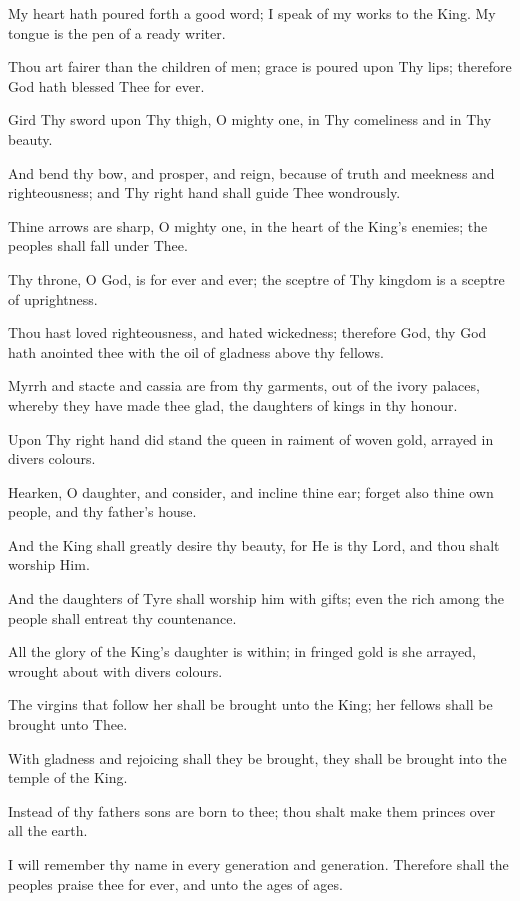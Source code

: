 My heart hath poured forth a good word; I speak of my works to the King. My tongue is the pen of a ready writer.

Thou art fairer than the children of men; grace is poured upon Thy lips; therefore God hath blessed Thee for ever.

Gird Thy sword upon Thy thigh, O mighty one, in Thy comeliness and in Thy beauty.

And bend thy bow, and prosper, and reign, because of truth and meekness and righteousness; and Thy right hand shall guide Thee wondrously.

Thine arrows are sharp, O mighty one, in the heart of the King’s enemies; the peoples shall fall under Thee.

Thy throne, O God, is for ever and ever; the sceptre of Thy kingdom is a sceptre of uprightness.

Thou hast loved righteousness, and hated wickedness; therefore God, thy God hath anointed thee with the oil of gladness above thy fellows.

Myrrh and stacte and cassia are from thy garments, out of the ivory palaces, whereby they have made thee glad, the daughters of kings in thy honour.

Upon Thy right hand did stand the queen in raiment of woven gold, arrayed in divers colours.

Hearken, O daughter, and consider, and incline thine ear; forget also thine own people, and thy father's house.

And the King shall greatly desire thy beauty, for He is thy Lord, and thou shalt worship Him.

And the daughters of Tyre shall worship him with gifts; even the rich among the people shall entreat thy countenance.

All the glory of the King’s daughter is within; in fringed gold is she arrayed, wrought about with divers colours.

The virgins that follow her shall be brought unto the King; her fellows shall be brought unto Thee.

With gladness and rejoicing shall they be brought, they shall be brought into the temple of the King.

Instead of thy fathers sons are born to thee; thou shalt make them princes over all the earth.

I will remember thy name in every generation and generation. Therefore shall the peoples praise thee for ever, and unto the ages of ages.
